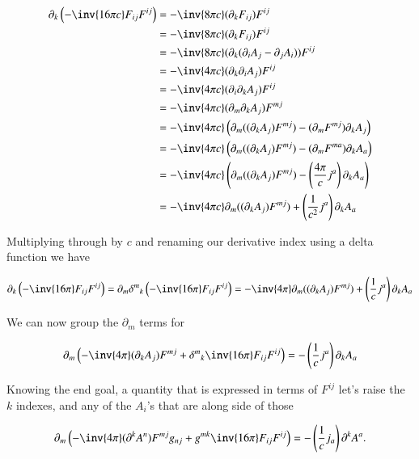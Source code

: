 \begin{align*}
\partial_k \left( -\inv{16 \pi c} F_{i j} F^{i j} \right) 
&= -\inv{8 \pi c} (\partial_k F_{i j} )F^{i j} \\
&= -\inv{8 \pi c} (\partial_k F_{i j} )F^{i j} \\
&= -\inv{8 \pi c} (\partial_k (\partial_i A_j - \partial_j A_i) )F^{i j} \\
&= -\inv{4 \pi c} (\partial_k \partial_i A_j )F^{i j} \\
&= -\inv{4 \pi c} (\partial_i \partial_k A_j )F^{i j} \\
&= -\inv{4 \pi c} (\partial_m \partial_k A_j )F^{m j} \\
&= -\inv{4 \pi c} \left( \partial_m ((\partial_k A_j )F^{m j}) - (\partial_m F^{m j}) \partial_k A_j \right) \\
&= -\inv{4 \pi c} \left( \partial_m ((\partial_k A_j )F^{m j}) - (\partial_m F^{m a}) \partial_k A_a \right) \\
&= -\inv{4 \pi c} \left( \partial_m ((\partial_k A_j )F^{m j}) - \left(\frac{4 \pi}{c} j^a \right) \partial_k A_a \right) \\
&= -\inv{4 \pi c} \partial_m ((\partial_k A_j )F^{m j}) + \left(\frac{1}{c^2} j^a \right) \partial_k A_a 
\end{align*}

Multiplying through by $c$ and renaming our derivative index using a delta function we have

\begin{equation}\label{eqn:relativisticElectrodynamicsL23:10}
\partial_k \left( -\inv{16 \pi } F_{i j} F^{i j} \right) =
\partial_m {\delta^{m}}_k \left( -\inv{16 \pi } F_{i j} F^{i j} \right) 
= -\inv{4 \pi } \partial_m ((\partial_k A_j )F^{m j}) + \left(\frac{1}{c} j^a \right) \partial_k A_a 
\end{equation}

We can now group the $\partial_m$ terms for

\begin{equation}\label{eqn:relativisticElectrodynamicsL23:30}
\partial_m \left(
-\inv{4 \pi } (\partial_k A_j )F^{m j}
+ {\delta^{m}}_k \inv{16 \pi } F_{i j} F^{i j} 
\right)
= 
- \left(\frac{1}{c} j^a \right) \partial_k A_a 
\end{equation}

Knowing the end goal, a quantity that is expressed in terms of $F^{ij}$ let's raise the $k$ indexes, and any of the $A_i$'s that are along side of those

\begin{equation}\label{eqn:relativisticElectrodynamicsL23:50}
\partial_m \left(
-\inv{4 \pi } (\partial^k A^n )F^{m j} g_{n j}
+ g^{m k} \inv{16 \pi } F_{i j} F^{i j} 
\right)
= 
- \left(\frac{1}{c} j_a \right) \partial^k A^a.
\end{equation}

